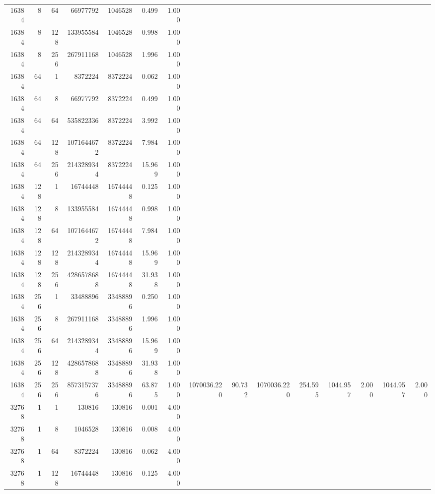 \begin{longtable}{rrrrrrrrrrrrrrr}
16384 & 8 & 64 & 66977792 & 1046528 & 0.499 & 1.000 &  &  &  &  &  &  &  & \\
16384 & 8 & 128 & 133955584 & 1046528 & 0.998 & 1.000 &  &  &  &  &  &  &  & \\
16384 & 8 & 256 & 267911168 & 1046528 & 1.996 & 1.000 &  &  &  &  &  &  &  & \\
16384 & 64 & 1 & 8372224 & 8372224 & 0.062 & 1.000 &  &  &  &  &  &  &  & \\
16384 & 64 & 8 & 66977792 & 8372224 & 0.499 & 1.000 &  &  &  &  &  &  &  & \\
16384 & 64 & 64 & 535822336 & 8372224 & 3.992 & 1.000 &  &  &  &  &  &  &  & \\
16384 & 64 & 128 & 1071644672 & 8372224 & 7.984 & 1.000 &  &  &  &  &  &  &  & \\
16384 & 64 & 256 & 2143289344 & 8372224 & 15.969 & 1.000 &  &  &  &  &  &  &  & \\
16384 & 128 & 1 & 16744448 & 16744448 & 0.125 & 1.000 &  &  &  &  &  &  &  & \\
16384 & 128 & 8 & 133955584 & 16744448 & 0.998 & 1.000 &  &  &  &  &  &  &  & \\
16384 & 128 & 64 & 1071644672 & 16744448 & 7.984 & 1.000 &  &  &  &  &  &  &  & \\
16384 & 128 & 128 & 2143289344 & 16744448 & 15.969 & 1.000 &  &  &  &  &  &  &  & \\
16384 & 128 & 256 & 4286578688 & 16744448 & 31.938 & 1.000 &  &  &  &  &  &  &  & \\
16384 & 256 & 1 & 33488896 & 33488896 & 0.250 & 1.000 &  &  &  &  &  &  &  & \\
16384 & 256 & 8 & 267911168 & 33488896 & 1.996 & 1.000 &  &  &  &  &  &  &  & \\
16384 & 256 & 64 & 2143289344 & 33488896 & 15.969 & 1.000 &  &  &  &  &  &  &  & \\
16384 & 256 & 128 & 4286578688 & 33488896 & 31.938 & 1.000 &  &  &  &  &  &  &  & \\
16384 & 256 & 256 & 8573157376 & 33488896 & 63.875 & 1.000 & 1070036.220 & 90.732 & 1070036.220 & 254.595 & 1044.957 & 2.000 & 1044.957 & 2.000\\
32768 & 1 & 1 & 130816 & 130816 & 0.001 & 4.000 &  &  &  &  &  &  &  & \\
32768 & 1 & 8 & 1046528 & 130816 & 0.008 & 4.000 &  &  &  &  &  &  &  & \\
32768 & 1 & 64 & 8372224 & 130816 & 0.062 & 4.000 &  &  &  &  &  &  &  & \\
32768 & 1 & 128 & 16744448 & 130816 & 0.125 & 4.000 &  &  &  &  &  &  &  & \\

\end{longtable}
